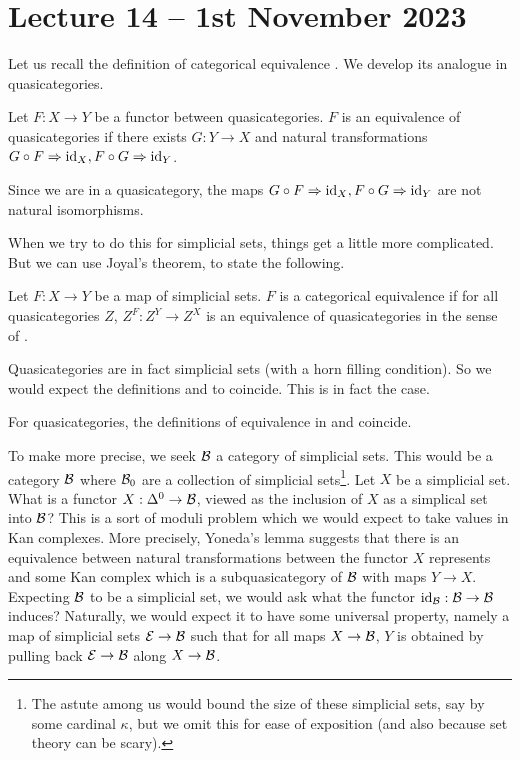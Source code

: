 \section{Lecture 14 -- 1st November 2023}
Let us recall the definition of categorical equivalence . We develop its analogue in quasicategories. 
\begin{definition}\label{def: quasicategorical equivalence}
    Let $F:X\to Y$ be a functor between quasicategories. $F$ is an equivalence of quasicategories if there exists $G:Y\to X$ and natural transformations $G\circ F\Rightarrow\mathrm{id}_{X}, F\circ G\Rightarrow\mathrm{id}_{Y}$. 
\end{definition}
\begin{remark}
    Since we are in a quasicategory, the maps $G\circ F\Rightarrow\mathrm{id}_{X}, F\circ G\Rightarrow\mathrm{id}_{Y}$ are not natural isomorphisms. 
\end{remark}
When we try to do this for simplicial sets, things get a little more complicated. But we can use Joyal's theorem,  to state the following. 
\begin{definition}\label{def: simplicial set equivalence}
    Let $F:X\to Y$ be a map of simplicial sets. $F$ is a categorical equivalence if for all quasicategories $Z$, $Z^{F}:Z^{Y}\to Z^{X}$ is an equivalence of quasicategories in the sense of . 
\end{definition}
Quasicategories are in fact simplicial sets (with a horn filling condition). So we would expect the definitions  and  to coincide. This is in fact the case. 
\begin{proposition}
    For quasicategories, the definitions of equivalence in  and  coincide.
\end{proposition}
To make  more precise, we seek $\mathcal{B}$ a category of simplicial sets. This would be a category $\mathcal{B}$ where $\mathcal{B}_{0}$ are a collection of simplicial sets\footnote{The astute among us would bound the size of these simplicial sets, say by some cardinal $\kappa$, but we omit this for ease of exposition (and also because set theory can be scary).}. Let $X$ be a simplicial set. What is a functor $X:\Delta^{0}\to\mathcal{B}$, viewed as the inclusion of $X$ as a simplical set into $\mathcal{B}$? This is a sort of moduli problem which we would expect to take values in Kan complexes. More precisely, Yoneda's lemma suggests that there is an equivalence between natural transformations between the functor $X$ represents and some Kan complex which is a subquasicategory of $\mathcal{B}$ with maps $Y\to X$. Expecting $\mathcal{B}$ to be a simplicial set, we would ask what the functor $\mathrm{id}_{\mathcal{B}}:\mathcal{B}\to\mathcal{B}$ induces? Naturally, we would expect it to have some universal property, namely a map of simplicial sets $\mathcal{E}\to\mathcal{B}$ such that for all maps $X\to\mathcal{B}$, $Y$ is obtained by pulling back $\mathcal{E}\to\mathcal{B}$ along $X\to\mathcal{B}$.  
